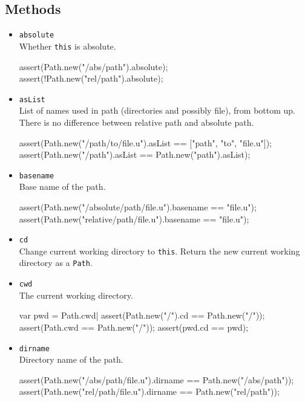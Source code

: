 \subsection{Methods}
\begin{itemize}
\item \lstinline|absolute|\\
  Whether \lstinline|this| is absolute.
\begin{urbiscript}[firstnumber=last]
assert(Path.new("/abs/path").absolute);
assert(!Path.new("rel/path").absolute);
\end{urbiscript}

\item \lstinline|asList|\\
  List of names used in path (directories and possibly file), from
  bottom up. There is no difference between relative path and absolute
  path.
\begin{urbiscript}[firstnumber=last]
assert(Path.new("/path/to/file.u").asList == ["path", "to", "file.u"]);
assert(Path.new("/path").asList           == Path.new("path").asList);
\end{urbiscript}

\item \lstinline|basename|\\
  Base name of the path.
\begin{urbiscript}[firstnumber=last]
assert(Path.new("/absolute/path/file.u").basename == "file.u");
assert(Path.new("relative/path/file.u").basename  == "file.u");
\end{urbiscript}

\item \lstinline|cd|\\
  Change current working directory to \lstinline|this|. Return the new
  current working directory as a \lstinline|Path|.

\item \lstinline|cwd|\\
  The current working directory.
\begin{urbiscript}[firstnumber=last]
var pwd = Path.cwd|
assert(Path.new("/").cd == Path.new("/"));
assert(Path.cwd         == Path.new("/"));
assert(pwd.cd           == pwd);
\end{urbiscript}

\item \lstinline|dirname|\\
  Directory name of the path.
\begin{urbiscript}[firstnumber=last]
assert(Path.new("/abs/path/file.u").dirname == Path.new("/abs/path"));
assert(Path.new("rel/path/file.u").dirname  == Path.new("rel/path"));
\end{urbiscript}


\end{itemize}
